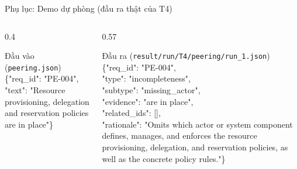 \documentclass[aspectratio=169,10pt]{beamer}
\begin{document}
\begin{frame}{Phụ lục: Demo dự phòng (đầu ra thật của T4)}
  \begin{columns}[T]
    \begin{column}{0.4\textwidth}
      \begin{block}{Đầu vào (\texttt{peering.json})}
        \ttfamily\scriptsize
        \{"req\_id": "PE-004",\\
        \hspace*{1em}"text": "Resource provisioning, delegation and reservation policies are in place"\}
      \end{block}
    \end{column}
    \begin{column}{0.57\textwidth}
      \begin{block}{Đầu ra (\texttt{result/run/T4/peering/run\_1.json})}
        \ttfamily\scriptsize
        \{"req\_id": "PE-004",\\
        \hspace*{1em}"type": "incompleteness",\\
        \hspace*{1em}"subtype": "missing\_actor",\\
        \hspace*{1em}"evidence": "are in place",\\
        \hspace*{1em}"related\_ids": [],\\
        \hspace*{1em}"rationale": "Omits which actor or system component defines, manages, and enforces the resource provisioning, delegation, and reservation policies, as well as the concrete policy rules."\}
      \end{block}
    \end{column}
  \end{columns}
\end{frame}
\end{document}
